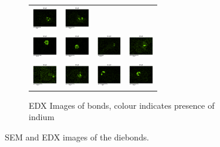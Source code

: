 \begin{figure}[h]
\begin{subfigure}[t]{0.4\textwidth}
\begin{tabular}{c c c c}
    \includegraphics[height=1cm]{Main/Ch2/extracted/Indium/In-EP-EDx_TLED-01-A2-s1_media_image7.png} &
    \includegraphics[height=1cm]{Main/Ch2/extracted/Indium/In-EP-EDx_TLED-01-A2-s2_media_image7.png} \\
    \includegraphics[height=1cm]{Main/Ch2/extracted/Indium/In-EP-EDx_TLED-01-B2-s1_media_image7.png} &
    \includegraphics[height=1cm]{Main/Ch2/extracted/Indium/In-EP-EDx_TLED-01-B2-s2_media_image7.png} &
    \includegraphics[height=1cm]{Main/Ch2/extracted/Indium/In-EP-EDx_TLED-02-A1-s1_media_image7.png} &
    \includegraphics[height=1cm]{Main/Ch2/extracted/Indium/In-EP-EDx_TLED-02-A1-s2_media_image7.png} \\
    \includegraphics[height=1cm]{Main/Ch2/extracted/Indium/In-EP-EDx_TLED-02-A2-s1_media_image7.png} &
    \includegraphics[height=1cm]{Main/Ch2/extracted/Indium/In-EP-EDx_TLED-02-A2-s2_media_image7.png} &
    \includegraphics[height=1cm]{Main/Ch2/extracted/Indium/In-EP-EDx_TLED-02-B2-s1_media_image7.png} &
    \includegraphics[height=1cm]{Main/Ch2/extracted/Indium/In-EP-EDx_TLED-02-B2-s2_media_image7.png} \\
    \end{tabular}
    \caption{EDX Images of bonds, colour indicates presence of indium}
    \label{fig:EDX_indium_2}
\end{subfigure}
\caption{SEM and EDX images of the diebonds.}
\end{figure}


